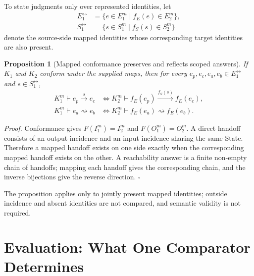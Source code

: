 \documentclass[conference]{IEEEtran}
\theoremstyle{tideproposition}
\newtheorem{proposition}{Proposition}
\newcommand{\direct}[3]{#1\xrightarrow{#2}#3}
\newcommand{\reach}{\rightsquigarrow}
\begin{document}
To state judgments only over represented identities, let
\begin{align*}
E_1^{\leftrightarrow}&=\{e\in E_1^m\mid f_E(e)\in E_2^m\},\\
S_1^{\leftrightarrow}&=\{s\in S_1^m\mid f_S(s)\in S_2^m\}
\end{align*}
denote the source-side mapped identities whose corresponding target identities are also present.

\begin{proposition}[Mapped conformance preserves and reflects scoped answers]\label{prop:conformance}
If $K_1$ and $K_2$ conform under the supplied maps, then for every $e_p,e_c,e_a,e_b\in E_1^{\leftrightarrow}$ and $s\in S_1^{\leftrightarrow}$,
\begin{align}
K_1^m\vdash\direct{e_p}{s}{e_c}
&\Longleftrightarrow
K_2^m\vdash\direct{f_E(e_p)}{f_S(s)}{f_E(e_c)},\\
K_1^m\vdash e_a\reach e_b
&\Longleftrightarrow
K_2^m\vdash f_E(e_a)\reach f_E(e_b).
\end{align}
\end{proposition}
\noindent\emph{Proof.}
Conformance gives $F(I_1^m)=I_2^m$ and $F(O_1^m)=O_2^m$. A direct handoff consists of an output incidence and an input incidence sharing the same State. Therefore a mapped handoff exists on one side exactly when the corresponding mapped handoff exists on the other. A reachability answer is a finite non-empty chain of handoffs; mapping each handoff gives the corresponding chain, and the inverse bijections give the reverse direction. \hfill$\square$

The proposition applies only to jointly present mapped identities; outside incidence and absent identities are not compared, and semantic validity is not required.

\section{Evaluation: What One Comparator Determines}
\end{document}
